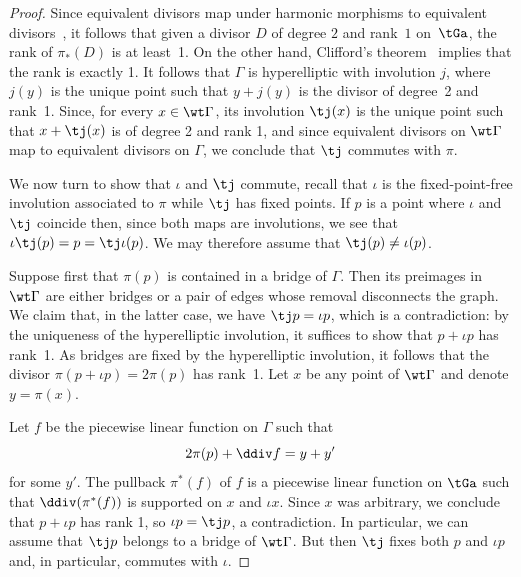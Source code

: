     \begin{proof} 
     Since equivalent divisors map under harmonic morphisms to equivalent divisors~\cite[Proposition 1.4.2]{LenUlirsch_Prym}, it follows that given a divisor  $D$ of degree $2$ and rank~$1$ on~$\tGa$, the rank of $\pi_*(D)$ is at least~1. On the other hand, Clifford's theorem~\cite[Theorem~1]{Facchini_Clifford} implies that the rank is exactly 1. It follows that $\Gamma$ is hyperelliptic with involution $j$, where $j(y)$ is the unique point such that $y+j(y)$ is the divisor of degree~2 and rank~1. Since, for every $x\in\wt\Gamma$, its involution $\tj(x)$ is the unique point such that $x+\tj(x)$ is of degree 2 and rank 1, and since equivalent divisors on $\wt\Gamma$ map to equivalent divisors on $\Gamma$, we conclude that $\tj$ commutes with $\pi$. 

    We now turn to show that $\iota$ and $\tj$ commute, recall that $\iota$ is the fixed-point-free involution associated to $\pi$ while $\tj$ has fixed points. 
     If $p$ is a point where $\iota$ and $\tj$ coincide then, since both maps are involutions, we see that $\iota\tj(p) = p = \tj\iota(p)$. We may therefore assume that $\tj(p)\neq\iota(p)$.
    

       Suppose first that $\pi(p)$  is contained in a bridge of $\Gamma$. Then its preimages in $\wt\Gamma$ are either bridges or a pair of edges whose removal disconnects the graph. 
              We claim that, in the latter case, we have $\tj p = \iota p$, which is a contradiction: by the uniqueness of the hyperelliptic involution, it suffices to show that $p+\iota p$ has rank~1. As bridges are fixed by the hyperelliptic involution, it follows that the divisor $\pi(p + \iota p) = 2\pi(p)$ has rank~1.  
Let $x$ be any point of $\wt\Gamma$ and denote $y=\pi(x)$.
 
Let $f$ be the piecewise linear function on $\Gamma$ such that \[2\pi(p)+\ddiv f=y+y'\]  for some $y'$. 
The pullback  $\pi^*(f)$ of $f$ is a piecewise linear function on $\tGa$ such that $\ddiv(\pi^*(f))$ is supported on $x$ and $\iota x$. Since $x$ was arbitrary, we conclude that $p+\iota p$ has rank 1, so $\iota p = \tj p$, a contradiction. In particular, we can assume that $\tj p$ belongs to a bridge of $\wt\Gamma$. But then $\tj$ fixes both $p$ and $\iota p$ and, in particular, commutes with $\iota $.  


\end{proof}
